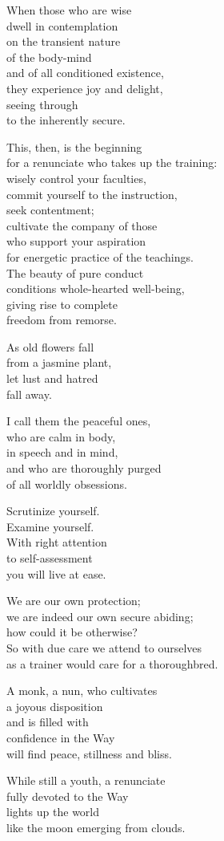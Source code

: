 When those who are wise\\
dwell in contemplation\\
on the transient nature\\
of the body-mind\\
and of all conditioned existence,\\
they experience joy and delight,\\
seeing through\\
to the inherently secure.


This, then, is the beginning\\
for a renunciate who takes up the training:\\
wisely control your faculties,\\
commit yourself to the instruction,\\
seek contentment;\\
cultivate the company of those\\
who support your aspiration\\
for energetic practice of the teachings.\\
The beauty of pure conduct\\
conditions whole-hearted well-being,\\
giving rise to complete\\
freedom from remorse.


As old flowers fall\\
from a jasmine plant,\\
let lust and hatred\\
fall away.


I call them the peaceful ones,\\
who are calm in body,\\
in speech and in mind,\\
and who are thoroughly purged\\
of all worldly obsessions.


Scrutinize yourself.\\
Examine yourself.\\
With right attention\\
to self-assessment\\
you will live at ease.


We are our own protection;\\
we are indeed our own secure abiding;\\
how could it be otherwise?\\
So with due care we attend to ourselves\\
as a trainer would care for a thoroughbred.

A monk, a nun, who cultivates\\
a joyous disposition\\
and is filled with\\
confidence in the Way\\
will find peace, stillness and bliss.


While still a youth, a renunciate\\
fully devoted to the Way\\
lights up the world\\
like the moon emerging from clouds.

